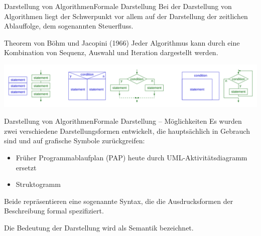 \documentclass[xelatex,aspectratio=169]{beamer}
\begin{document}
\begin{frame}{Darstellung von Algorithmen}{Formale Darstellung}
  Bei der Darstellung von Algorithmen liegt der Schwerpunkt vor allem auf der Darstellung der zeitlichen Ablauffolge, dem sogenannten Steuerfluss.

  \begin{block}{Theorem von Böhm und Jacopini (1966)}
    Jeder Algorithmus kann durch eine Kombination von Sequenz, Auswahl und Iteration dargestellt werden.
  \end{block}

  \includegraphics[width=\textwidth]{img/structured_program_patterns.png}
\end{frame}

\begin{frame}{Darstellung von Algorithmen}{Formale Darstellung -- Möglichkeiten}
  Es wurden zwei verschiedene Darstellungsformen entwickelt, die hauptsächlich in Gebrauch sind und auf grafische Symbole zurückgreifen:

  \begin{itemize}
    \item Früher Programmablaufplan (PAP) \rightarrow heute durch UML-Aktivitätsdiagramm ersetzt
    \item Struktogramm
  \end{itemize}

  Beide repräsentieren eine sogenannte Syntax, die die Ausdrucksformen der Beschreibung formal spezifiziert.

  Die Bedeutung der Darstellung wird als Semantik bezeichnet.
\end{frame}
\end{document}
